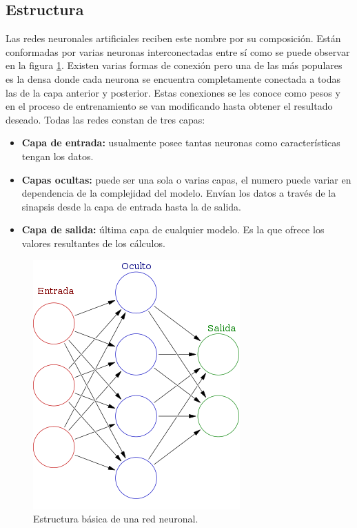 \subsection{Estructura}
Las redes neuronales artificiales reciben este nombre por su composición. Están conformadas por varias neuronas interconectadas entre s\'i como se puede observar en la figura \ref{fig:neural_network}. Existen varias formas de conexión pero una de las más populares es la densa donde cada neurona se encuentra completamente conectada a todas las de la capa anterior y posterior. Estas conexiones se les conoce como pesos y en el proceso de entrenamiento se van modificando hasta obtener el resultado deseado. Todas las redes constan de tres capas:

\begin{itemize}
    \item \textbf{Capa de entrada:} usualmente posee tantas neuronas como características tengan los datos.
    \item \textbf{Capas ocultas:} puede ser una sola o varias capas, el numero puede variar en dependencia de la complejidad del modelo. Envían los datos a través de la sinapsis desde la capa de entrada hasta la de salida.
    \item \textbf{Capa de salida:} última capa de cualquier modelo. Es la que ofrece los valores resultantes de los cálculos.
\end{itemize}

\begin{figure}[h!t]
    \centering
    \includegraphics[width=.6\linewidth]{Images/neural_network.png}
    \caption{Estructura básica de una red neuronal.}
    \label{fig:neural_network}
\end{figure}

